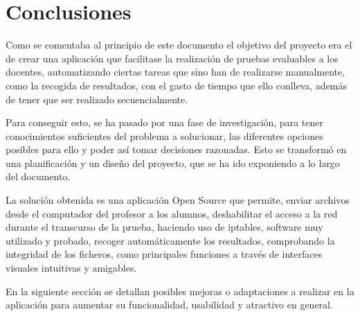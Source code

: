 

\label{chap:futuro}

\section{Conclusiones}
\label{sec:futuro:conclusiones}

Como se comentaba al principio de este documento el objetivo del proyecto era el de crear una aplicación que facilitase la realización de pruebas evaluables a los docentes, automatizando ciertas tareas que sino han de realizarse manualmente, como la recogida de resultados, con el gasto de tiempo que ello conlleva, además de tener que ser realizado secuencialmente.
\newline

Para conseguir esto, se ha pasado por una fase de investigación, para tener conocimientos suficientes del problema a solucionar, las diferentes opciones posibles para ello y poder así tomar decisiones razonadas. Esto se transformó en una planificación y un diseño del proyecto, que se ha ido exponiendo a lo largo del documento.
\newline

La solución obtenida es una aplicación Open Source que permite, enviar archivos desde el computador del profesor a los alumnos, deshabilitar el acceso a la red durante el transcurso de la prueba, haciendo uso de iptables, software muy utilizado y probado, recoger automáticamente los resultados, comprobando la integridad de los ficheros, como principales funciones a través de interfaces visuales intuitivas y amigables.
\newline

En la siguiente sección se detallan posibles mejoras o adaptaciones a realizar en la aplicación para aumentar su funcionalidad, usabilidad y atractivo en general.

